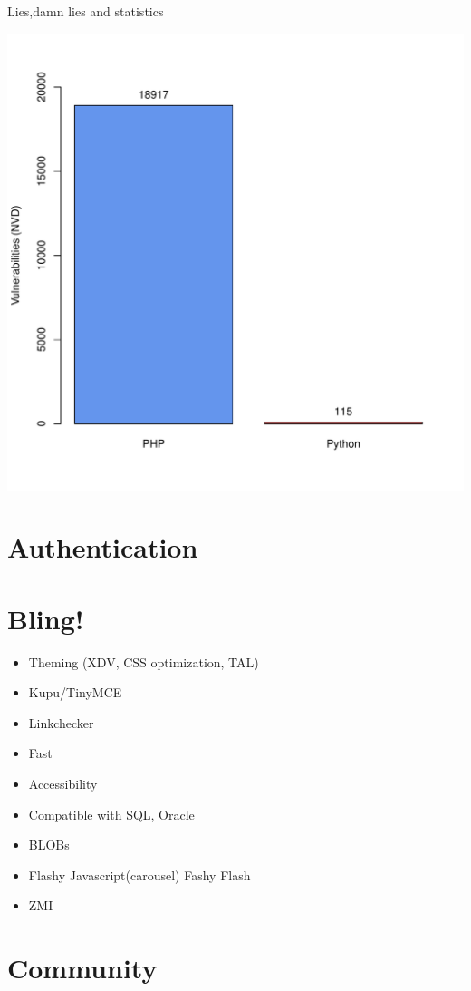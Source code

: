 \documentclass[arial,pdftex]{beamer}
\begin{document}
\begin{frame}{Lies,damn lies and statistics}
  \begin{center}
    \includegraphics[keepaspectratio,height=0.8\textheight]{lang-nvd.pdf}
  \end{center}
\end{frame}%


\section{Authentication}


\section{Bling!}
\begin{frame}
  \begin{itemize}
    \pause \item Theming (XDV, CSS optimization, TAL)
    \pause \item Kupu/TinyMCE
    \pause \item Linkchecker
    \pause \item Fast
    \pause \item Accessibility
    \pause \item Compatible with SQL, Oracle
    \pause \item BLOBs
    \pause \item Flashy Javascript(carousel) Fashy Flash
    \pause \item ZMI
  \end{itemize}
\end{frame}

\section{Community}

\end{document}
